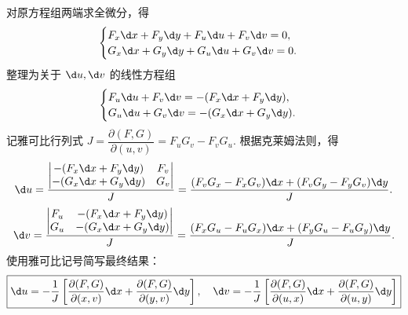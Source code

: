 \begin{solution}
    对原方程组两端求全微分，得
    \begin{equation}
        \begin{cases}
            F_x \d x + F_y \d y + F_u \d u + F_v \d v = 0, \\
            G_x \d x + G_y \d y + G_u \d u + G_v \d v = 0.
        \end{cases}
    \end{equation}
    整理为关于 $\d u, \d v$ 的线性方程组
    \begin{equation}
        \begin{cases}
            F_u \d u + F_v \d v = -(F_x \d x + F_y \d y), \\
            G_u \d u + G_v \d v = -(G_x \d x + G_y \d y).
        \end{cases}
    \end{equation}
    记雅可比行列式 $J = \dfrac{\partial(F,G)}{\partial(u,v)} = F_u G_v - F_v G_u$. 根据克莱姆法则，得
    \begin{equation}
        \d u = \frac{\begin{vmatrix} -(F_x \d x + F_y \d y) & F_v \\ -(G_x \d x + G_y \d y) & G_v \end{vmatrix}}{J} = \frac{(F_v G_x - F_x G_v) \d x + (F_v G_y - F_y G_v) \d y}{J}.
    \end{equation}
    \begin{equation}
        \d v = \frac{\begin{vmatrix} F_u & -(F_x \d x + F_y \d y) \\ G_u & -(G_x \d x + G_y \d y) \end{vmatrix}}{J} = \frac{(F_x G_u - F_u G_x) \d x + (F_y G_u - F_u G_y) \d y}{J}.
    \end{equation}
    使用雅可比记号简写最终结果：
    \begin{equation}
        \boxed{\d u = -\frac{1}{J} \left[ \frac{\partial(F,G)}{\partial(x,v)} \d x + \frac{\partial(F,G)}{\partial(y,v)} \d y \right], \quad \d v = -\frac{1}{J} \left[ \frac{\partial(F,G)}{\partial(u,x)} \d x + \frac{\partial(F,G)}{\partial(u,y)} \d y \right]}
    \end{equation}
\end{solution}

\endinput
